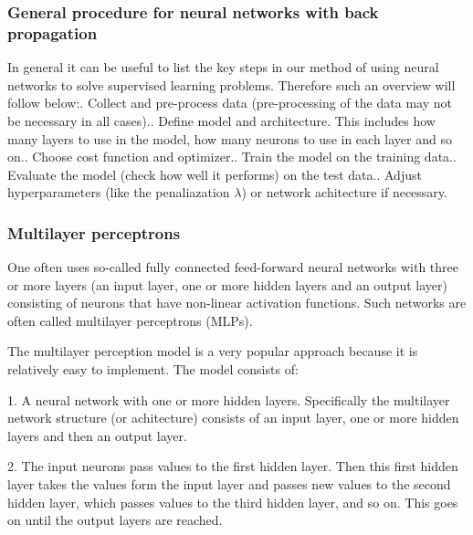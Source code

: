 \documentclass[a4paper,12pt]{article}
\begin{document}
\subsubsection{General procedure for neural networks with back propagation}
In general it can be useful to list the key steps in our method of using neural networks to solve supervised learning problems. Therefore such an overview will follow below:. Collect and pre-process data (pre-processing of the data may not be necessary in all cases).. Define model and architecture. This includes how many layers to use in the model, how many neurons to use in each layer and so on.. Choose cost function and optimizer.. Train the model on the training data.. Evaluate the model (check how well it performs) on the test data.. Adjust hyperparameters (like the penaliazation $\lambda$) or network achitecture if necessary.

\subsubsection{Multilayer perceptrons}
One often uses so-called fully connected feed-forward neural networks with three or more layers (an input layer, one or more hidden layers and an output layer) consisting of neurons that have non-linear activation functions. Such networks are often called multilayer perceptrons (MLPs).\newline

The multilayer perception model is a very popular approach because it is relatively easy to implement. The model consists of:\newline

1. A neural network with one or more hidden layers. Specifically the multilayer network structure (or achitecture) consists of an input layer, one or more hidden layers and then an output layer.\newline

2. The input neurons pass values to the first hidden layer. Then this first hidden layer takes the values form the input layer and passes new values to the second hidden layer, which passes values to the third hidden layer, and so on. This goes on until the output layers are reached. \newline
\end{document}
